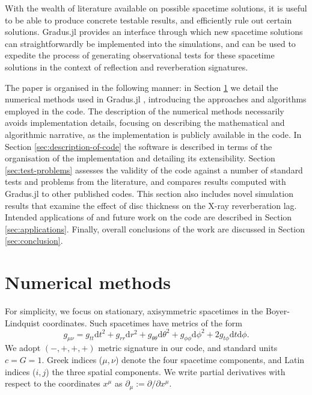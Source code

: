 \documentclass[fleqn,usenatbib]{mnras}
\newcommand{\Gradus}{Gradus.jl }
\renewcommand{\d}{\text{d}}
\begin{document}
With the wealth of literature available on possible spacetime solutions, it is
useful to be able to produce concrete testable results, and efficiently rule out
certain solutions. \Gradus provides an interface through which new spacetime
solutions can straightforwardly be implemented into the simulations, and can be
used to expedite the process of generating observational tests for these
spacetime solutions in the context of reflection and reverberation signatures.

The paper is organised in the following manner: in Section
\ref{sec:numerical-methods} we detail the numerical methods used in \Gradus,
introducing the approaches and algorithms employed in the code. The description
of the numerical methods necessarily avoids implementation details, focusing on
describing the mathematical and algorithmic narrative, as the implementation is
publicly available in the code. In Section \ref{sec:description-of-code} the
software is described in terms of the organisation of the implementation and
detailing its extensibility. Section \ref{sec:test-problems} assesses the
validity of the code against a number of standard tests and problems from the
literature, and compares results computed with \Gradus to other published codes.
This section also includes novel simulation results that examine the effect of
disc thickness on the X-ray reverberation lag. Intended applications of and
future work on the code are described in Section \ref{sec:applications}.
Finally, overall conclusions of the work are discussed in Section
\ref{sec:conclusion}.

\section{Numerical methods}
\label{sec:numerical-methods}

For simplicity, we focus on stationary, axisymmetric spacetimes in the
Boyer-Lindquist coordinates. Such spacetimes have metrics of the form
\begin{equation}
\label{eq:stationary_axisymmetric_metric}
    g_{\mu\nu}
    = g_{tt} \d t^2
    + g_{rr} \d r^2
    + g_{\theta\theta} \d \theta^2
    + g_{\phi\phi} \d \phi^2
    + 2g_{t\phi} \d t \d \phi.
\end{equation}
We adopt $(-, +, +, +)$ metric signature in our code, and standard units $c = G
= 1$. Greek indices ($\mu, \nu$) denote the four spacetime components, and Latin
indices ($i, j$) the three spatial components. We write partial derivatives with
respect to the coordinates $x^\mu$ as $\partial_\mu := \partial / \partial
x^\mu$.
\end{document}
